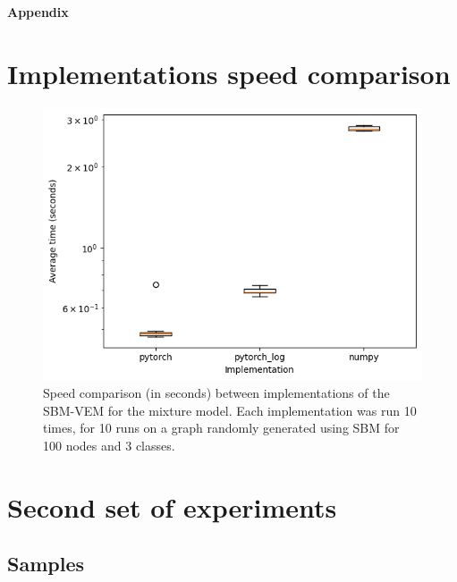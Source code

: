 \documentclass[switch, 12pt]{article}
\begin{document}
\newpage


\appendix

\begin{center}
    {\Huge \bfseries Appendix} \\[0.5cm]
\end{center}

\section{Implementations speed comparison}
\label{app:speed_comparison}

\begin{figure}[h]
    \centering
    \includegraphics[width=0.5\linewidth]{figures/speed_comparison_VEM.png}
    \caption{Speed comparison (in seconds) between implementations of the SBM-VEM for the mixture model. Each implementation was run 10 times, for 10 runs on a graph randomly generated using SBM for 100 nodes and 3 classes.}
    \label{fig:speed_comparison}
\end{figure}

\newpage

\section{Second set of experiments}
\label{app:sbm}

\subsection{Samples}

\hphantom{.}  %
\end{document}
